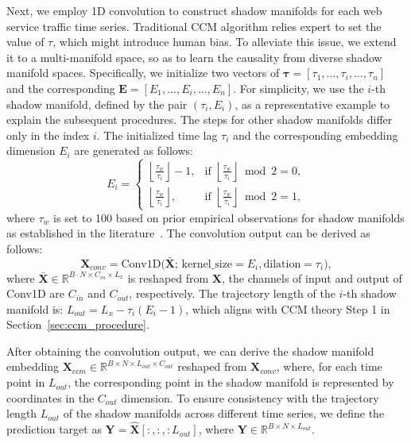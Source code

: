 Next, we employ 1D convolution to construct shadow manifolds for each web service traffic time series.
Traditional CCM algorithm relies expert to set the value of $\tau$, which might introduce human bias.
To alleviate this issue, we extend it to a multi-manifold space, so as to learn the causality from diverse shadow manifold spaces.
Specifically, we initialize two vectors of \( \mathbf{\tau} = [\tau_1, \ldots, \tau_i, \ldots, \tau_n] \) and the corresponding \( \mathbf{E} = [E_1, \ldots, E_i, \ldots, E_n] \).
For simplicity, we use the \( i \)-th shadow manifold, defined by the pair \( (\tau_i, E_i) \), as a representative example to explain the subsequent procedures. The steps for other shadow manifolds differ only in the index \( i \). 
The initialized time lag $\tau_i$ and the corresponding embedding dimension $E_i$ are generated as follows:
\begin{equation}
E_i = 
\begin{cases} 
\left\lfloor \frac{\tau_w}{\tau_i} \right\rfloor - 1, & \text{if } \left\lfloor \frac{\tau_w}{\tau_i} \right\rfloor \bmod 2 = 0, \\[0.5em]
\left\lfloor \frac{\tau_w}{\tau_i} \right\rfloor, & \text{if } \left\lfloor \frac{\tau_w}{\tau_i} \right\rfloor \bmod 2 = 1,\nonumber
\end{cases} 
\end{equation}
where \( \tau_w \) is set to 100 based on prior empirical observations for shadow manifolds as established in the literature~\cite{kugiumtzis1996state}.
The convolution output can be derived as follows:
\begin{equation}
\mathbf{X}_{conv} = \text{Conv1D}\bigl(\bar{\mathbf{X}};\, \text{kernel\_size}=E_i, \text{dilation}=\tau_i\bigr),\nonumber
\end{equation}
where $\bar{\mathbf{X}} \in \mathbb{R}^{B\cdot N \times C_{in}\times L_x} $ is reshaped from $\mathbf{X}$, the channels of input and output of Conv1D are ${C_{in}}$ and ${C_{out}}$, respectively. 
The trajectory length of the \( i \)-th shadow manifold is: $L_{out} = L_x - \tau_i (E_i - 1)$, which aligns with CCM theory Step 1 in Section~\ref{sec:ccm_procedure}.

After obtaining the convolution output, we can derive the shadow manifold embedding $\mathbf{X}_{ccm} \in \mathbb{R}^{B\times N\times L_{out}\times C_{out}}$ reshaped from $\mathbf{X}_{conv}$, where, for each time point in \( L_{out} \), the corresponding point in the shadow manifold is represented by coordinates in the \( C_{out} \) dimension. To ensure consistency with the trajectory length \( L_{out} \) of the shadow manifolds across different time series, we define the prediction target as \( \mathbf{Y} = \hat{\mathbf{X}}[:, :, :L_{out}] \), where $\mathbf{Y} \in \mathbb{R}^{B\times N\times L_{out}}$.

